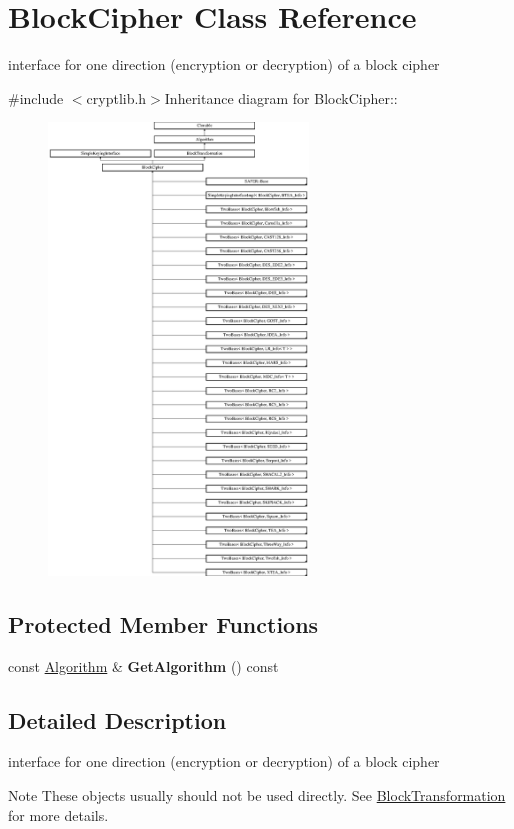 \hypertarget{class_block_cipher}{
\section{BlockCipher Class Reference}
\label{class_block_cipher}
}


interface for one direction (encryption or decryption) of a block cipher  


{\ttfamily \#include $<$cryptlib.h$>$}Inheritance diagram for BlockCipher::\begin{figure}[H]
\begin{center}
\leavevmode
\includegraphics[height=12cm]{class_block_cipher}
\end{center}
\end{figure}
\subsection*{Protected Member Functions}
\begin{DoxyCompactItemize}
\item 
\hypertarget{class_block_cipher_ad91b5765499a85e5914d8401e28ffe2e}{
const \hyperlink{class_algorithm}{Algorithm} \& {\bfseries GetAlgorithm} () const }
\label{class_block_cipher_ad91b5765499a85e5914d8401e28ffe2e}

\end{DoxyCompactItemize}


\subsection{Detailed Description}
interface for one direction (encryption or decryption) of a block cipher \begin{DoxyNote}{Note}
These objects usually should not be used directly. See \hyperlink{class_block_transformation}{BlockTransformation} for more details. 
\end{DoxyNote}


